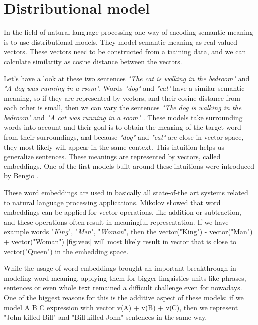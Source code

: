 \section{Distributional model}
In the field of natural language processing one way of encoding semantic meaning is to use distributional models. They model semantic meaning as real-valued vectors. These vectors need to be constructed from a training data, and we can calculate similarity as cosine distance between the vectors.

Let's have a look at these two sentences \textit{"The cat is walking in the bedroom"} and \textit{"A dog was running in a room"}. Words \textit{"dog"} and \textit{"cat"} have a similar semantic meaning, so if they are represented by vectors, and their cosine distance from each other is small, then we can vary the sentences \textit{"The dog is walking in the bedroom"} and \textit{"A cat was running in a room"} \cite{Bengio:2003}. These models take surrounding words into account and their goal is to obtain the meaning of the target word from their surroundings\cite{Jurafsky:2018}, and because \textit{"dog"} and \textit{"cat"} are close in vector space, they most likely will appear in the same context. This intuition helps us generalize sentences. These meanings are represented by vectors, called embeddings. One of the first models built around these intuitions were introduced by Bengio \cite{Bengio:2003}. 

These word embeddings are used in basically all state-of-the art systems related to natural language processing applications. Mikolov \cite{Mikolov:2013c} showed that word embeddings can be applied for vector operations, like addition or subtraction, and these operations often result in meaningful representation. If we have example words "\textit{King}", "\textit{Man}", "\textit{Woman}", then the vector("King") - vector("Man") + vector("Woman") \ref{fig:vecs} will most likely result in vector that is close to vector("Queen") in the embedding space.

 While the usage of word embeddings brought an important breakthrough in modeling word meaning, applying them for bigger linguistics units like phrases, sentences or even whole text remained a difficult challenge even for nowadays. One of the biggest reasons for this is the additive aspect of these models: if we model A B C expression with vector v(A) + v(B) + v(C), then we represent "John killed Bill" and "Bill killed John" sentences in the same way. 

